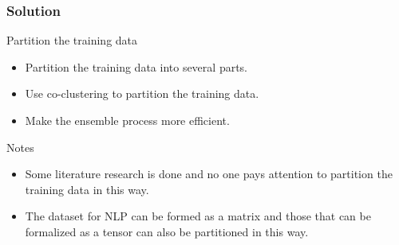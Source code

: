 \documentclass[serif]{beamer}
\begin{document}
\begin{frame}
    \frametitle{Solution}

    \begin{block}{Partition the training data}
        \begin{itemize}
            \item Partition the training data into several parts.
            \item Use co-clustering to partition the training data.
            \item Make the ensemble process more efficient.
        \end{itemize}
    \end{block}

    \begin{block}{Notes}
        \begin{itemize}
            \item Some literature research is done and no one pays attention to partition the training data in this way.
            \item The dataset for NLP can be formed as a matrix and those that can be formalized as a tensor can also be partitioned in this way.
        \end{itemize}
    \end{block}




\end{frame}
\end{document}
